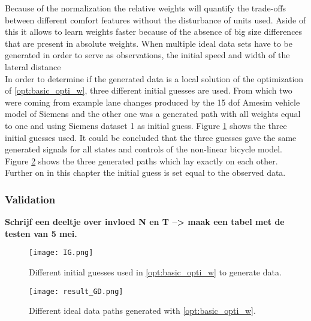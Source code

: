 Because of the normalization the relative weights will quantify the trade-offs between different comfort features without the disturbance of units used. Aside of this it allows to learn weights faster because of the absence of big size differences that are present in absolute weights. When multiple ideal data sets have to be generated in order to serve as observations, the initial speed and width of the lateral distance \\
In order to determine if the generated data is a local solution of the optimization of \ref{opt:basic_opti_w}, three different initial guesses are used. From which two were coming from example lane changes produced by the 15 dof Amesim vehicle model of Siemens and the other one was a generated path with all weights equal to one and using Siemens dataset 1 as initial guess. Figure \ref{fig:IG} shows the three initial guesses used. It could be concluded that the three guesses gave the same generated signals for all states and controls of the non-linear bicycle model. Figure \ref{fig:result_GD} shows the three generated paths which lay exactly on each other. Further on in this chapter the initial guess is set equal to the observed data.

\subsubsection{Validation} \label{s:GD_val}




\textbf{Schrijf een deeltje over invloed N en T --> maak een tabel met de testen van 5 mei.}

\begin{figure}[h!]
	\centering
	\texttt{[image: IG.png]}
	\caption{Different initial guesses used in \ref{opt:basic_opti_w} to generate data.}
	\label{fig:IG}
\end{figure}

\begin{figure}[h!]
	\centering
	\texttt{[image: result\_GD.png]}
	\caption{Different ideal data paths generated with \ref{opt:basic_opti_w}.}
	\label{fig:result_GD}
\end{figure}



